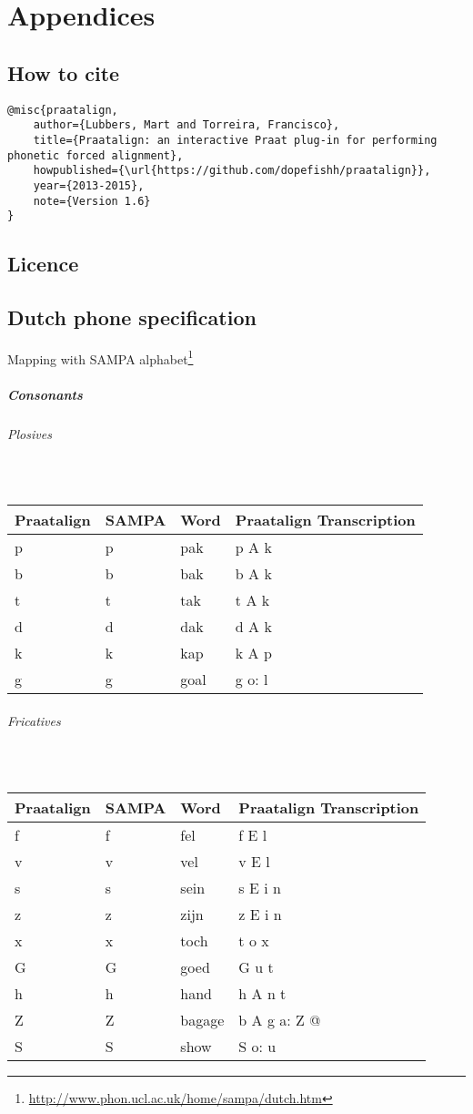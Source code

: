 \chapter{Appendices}
\section{How to cite}
\begin{lstlisting}[caption={Bibtex snippet},breaklines=true]
@misc{praatalign,
	author={Lubbers, Mart and Torreira, Francisco},
	title={Praatalign: an interactive Praat plug-in for performing phonetic forced alignment},
	howpublished={\url{https://github.com/dopefishh/praatalign}},
	year={2013-2015},
	note={Version 1.6}
}
\end{lstlisting}

\section{Licence}


\newpage
\section{Dutch phone specification}
\label{sec:sldutch}
Mapping with SAMPA
alphabet\footnote{\url{http://www.phon.ucl.ac.uk/home/sampa/dutch.htm}}

\paragraph{Consonants}
\subparagraph{Plosives}\strut\\
\begin{tabular}{llll}
	Praatalign & SAMPA & Word & Praatalign Transcription\\
	\hline
		p & p & pak & p A k\\
		b & b & bak & b A k\\
		t & t & tak & t A k\\
		d & d & dak & d A k\\
		k & k & kap & k A p\\
		g & g & goal & g o: l
\end{tabular}

\subparagraph{Fricatives}\strut\\
\begin{tabular}{llll}
	Praatalign & SAMPA & Word & Praatalign Transcription\\
	\hline
	f & f & fel & f E l\\
	v & v & vel & v E l\\
	s & s & sein & s E i n\\
	z & z & zijn & z E i n\\
	x & x & toch & t o x\\
	G & G & goed & G u t\\
	h & h & hand & h A n t\\
	Z & Z & bagage & b A g a: Z @\\
	S & S & show & S o: u
\end{tabular}


